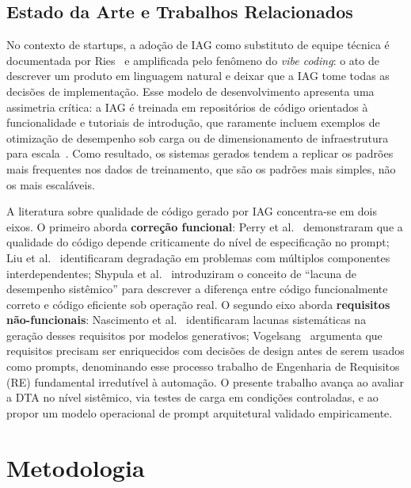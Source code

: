 \documentclass[sigconf]{acmart}
\begin{document}
\subsection{Estado da Arte e Trabalhos Relacionados}
\label{sec:trabalhos_relacionados}

No contexto de startups, a adoção de IAG como substituto de equipe técnica é
documentada por Ries~\cite{Ries2012} e amplificada pelo fenômeno do \textit{vibe
coding}: o ato de descrever um produto em linguagem natural e deixar que a IAG
tome todas as decisões de implementação. Esse modelo de desenvolvimento apresenta
uma assimetria crítica: a IAG é treinada em repositórios de código orientados à
funcionalidade e tutoriais de introdução, que raramente incluem exemplos de
otimização de desempenho sob carga ou de dimensionamento de infraestrutura para
escala~\cite{Nascimento2024}. Como resultado, os sistemas gerados tendem a replicar
os padrões mais frequentes nos dados de treinamento, que são os padrões mais
simples, não os mais escaláveis.

A literatura sobre qualidade de código gerado por IAG concentra-se em dois eixos.
O primeiro aborda \textbf{correção funcional}: Perry et al.~\cite{Perry2023}
demonstraram que a qualidade do código depende criticamente do nível de especificação
no prompt; Liu et al.~\cite{Liu2023} identificaram degradação em problemas com
múltiplos componentes interdependentes; Shypula et al.~\cite{Shypula2023}
introduziram o conceito de ``lacuna de desempenho sistêmico'' para descrever a
diferença entre código funcionalmente correto e código eficiente sob operação real.
O segundo eixo aborda \textbf{requisitos não-funcionais}: Nascimento et
al.~\cite{Nascimento2024} identificaram lacunas sistemáticas na geração desses
requisitos por modelos generativos; Vogelsang~\cite{Vogelsang2024} argumenta que
requisitos precisam ser enriquecidos com decisões de design antes de serem usados
como prompts, denominando esse processo trabalho de Engenharia de Requisitos (RE) fundamental irredutível à
automação. O presente trabalho avança ao avaliar a DTA no nível sistêmico, via
testes de carga em condições controladas, e ao propor um modelo operacional de
prompt arquitetural validado empiricamente.

\section{Metodologia}
\end{document}
